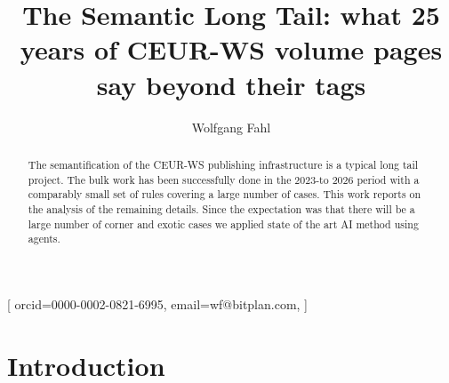 \documentclass{ceurart}
\begin{document}


\title{The Semantic Long Tail: what 25 years of CEUR-WS volume pages say beyond their tags}
\tnotemark[1]

\author[1,2]{Wolfgang Fahl}[%
orcid=0000-0002-0821-6995,
email=wf@bitplan.com,
]
\cormark[1]
\address[1]{RWTH Aachen University, Computer Science i5, Aachen, Germany}
\address[2]{BITPlan GmbH, Willich, Germany}

\begin{abstract}
The semantification of the CEUR-WS publishing infrastructure is a typical long tail project. The bulk work has been successfully done in the 2023-to 2026 period with a comparably small set of rules covering a large number of cases. This work reports on the analysis of the remaining details. Since the expectation was that there will be a large number of corner and exotic cases we applied state of the art AI method using agents. 
\end{abstract}

\begin{keywords}
\end{keywords}

\maketitle

\section{Introduction}\label{sec:introduction}
\end{document}
